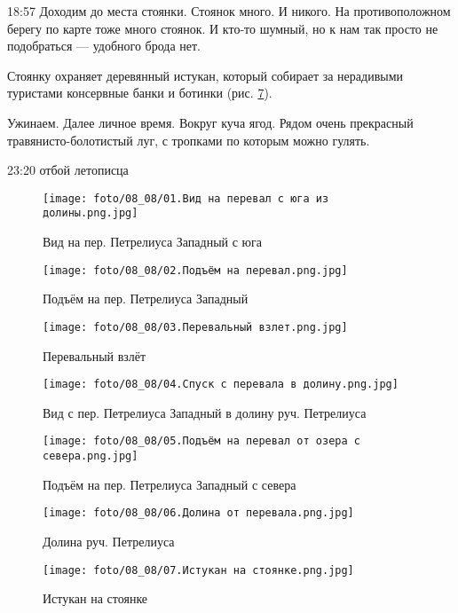 18:57 Доходим до места стоянки. Стоянок много. И никого.
На противоположном берегу по карте тоже много стоянок. И кто-то шумный, но к нам так просто не подобраться --- удобного брода нет.

Стоянку охраняет деревянный истукан, который собирает за нерадивыми туристами консервные банки и ботинки (рис. \ref{fig4:7}).

Ужинаем. Далее личное время.
Вокруг куча ягод. Рядом очень прекрасный тра\-вя\-ни\-сто-бо\-ло\-тис\-тый луг, с тропками по которым можно гулять.

23:20 отбой летописца

\begin{figure}
    \centering
    \texttt{[image: foto/08\_08/01.Вид на перевал с юга из долины.png.jpg]}
    \caption{Вид на пер. Петрелиуса Западный с юга}
    \label{fig4:1}
\end{figure}

\begin{figure}
    \centering
    \texttt{[image: foto/08\_08/02.Подъём на перевал.png.jpg]}
    \caption{Подъём на пер. Петрелиуса Западный}
    \label{fig4:2}
\end{figure}

\begin{figure}
    \centering
    \texttt{[image: foto/08\_08/03.Перевальный взлет.png.jpg]}
    \caption{Перевальный взлёт}
    \label{fig4:3}
\end{figure}

\begin{figure}
    \centering
    \texttt{[image: foto/08\_08/04.Спуск с перевала в долину.png.jpg]}
    \caption{Вид с пер. Петрелиуса Западный в долину руч. Петрелиуса}
    \label{fig4:4}
\end{figure}

\begin{figure}
    \centering
    \texttt{[image: foto/08\_08/05.Подъём на перевал от озера с севера.png.jpg]}
    \caption{Подъём на пер. Петрелиуса Западный с севера}
    \label{fig4:5}
\end{figure}

\begin{figure}
    \centering
    \texttt{[image: foto/08\_08/06.Долина от перевала.png.jpg]}
    \caption{Долина руч. Петрелиуса}
    \label{fig4:6}
\end{figure}

\begin{figure}
    \centering
    \texttt{[image: foto/08\_08/07.Истукан на стоянке.png.jpg]}
    \caption{Истукан на стоянке}
    \label{fig4:7}
\end{figure}

